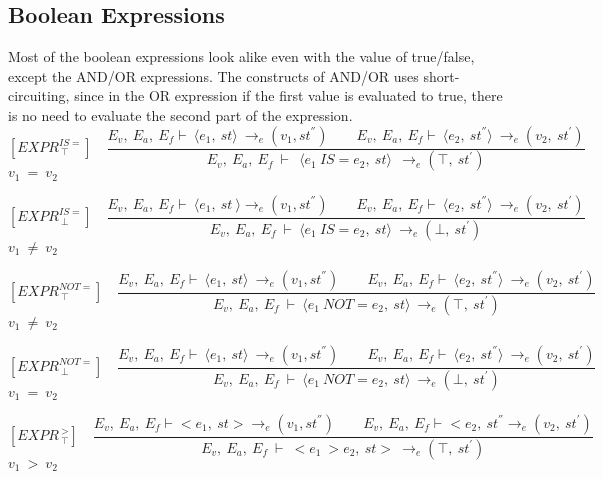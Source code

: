    	\subsection{Boolean Expressions}
   	Most of the boolean expressions look alike even with the value of true/false, except the AND/OR expressions. The constructs of AND/OR uses short-circuiting, since in the OR expression if the first value is evaluated to true, there is no need to evaluate the second part of the expression.
   	\[
   	[EXPR^{IS=}_{\ \top}] \quad
   	\dfrac{E_v, \ E_a, \ E_f \vdash \ \langle e_1, \ st \rangle \ \rightarrow_e (v_1, st^{''}) \qquad E_v, \ E_a, \ E_f \vdash \ \langle e_2, \ st^{''} \rangle \ \rightarrow_e (v_2, \ st^{'})}{E_v, \ E_a, \ E_f \ \vdash \ \ \langle e_1
   	\ IS= e_2, \ st \rangle \ \ \rightarrow_e (\top, \ st^{'})}
   	\]
   	\begin{math}
   	v_1 \ = \ v_2 
   	\end{math}

   	\[
   	[EXPR^{IS=}_{\ \bot}] \quad
   	\dfrac{E_v, \ E_a, \ E_f \vdash \ \langle e_1, \ st \ \rangle \rightarrow_e (v_1, st^{''}) \qquad E_v, \ E_a, \ E_f \vdash \ \langle e_2, \ st^{''} \rangle \ \rightarrow_e (v_2, \ st^{'})}{E_v, \ E_a, \ E_f \ \vdash \ \langle e_1
   	\ IS= e_2, \ st \rangle \ \rightarrow_e (\bot, \ st^{'})}
   	\]
	\begin{math}
   	v_1 \ \not= \ v_2
   	\end{math}


   	\[
   	[EXPR^{NOT=}_{\ \top}] \quad
   	\dfrac{E_v, \ E_a, \ E_f \vdash \ \langle e_1, \ st \rangle \ \rightarrow_e (v_1, st^{''}) \qquad E_v, \ E_a, \ E_f \vdash \ \langle e_2, \ st^{''} \rangle \ \rightarrow_e (v_2, \ st^{'})}{E_v, \ E_a, \ E_f \ \vdash \ \langle e_1 \ NOT= e_2, \ st \rangle \ \rightarrow_e (\top, \ st^{'})}
   	\]
	\begin{math}
   	v_1 \ \not= \ v_2
   	\end{math}   	
   	

   	\[
   	[EXPR^{NOT=}_{\ \bot}] \quad
   	\dfrac{E_v, \ E_a, \ E_f \vdash \ \langle e_1, \ st \rangle \ \rightarrow_e (v_1, st^{''}) \qquad E_v, \ E_a, \ E_f \vdash \ \langle e_2, \ st^{''} \rangle \ \rightarrow_e (v_2, \ st^{'})}{E_v, \ E_a, \ E_f \ \vdash \ \langle e_1 \ NOT= e_2, \ st \rangle \ \rightarrow_e (\bot, \ st^{'})}
   	\]
	\begin{math}
   	v_1 \ = \ v_2
   	\end{math}   	
   	
   	
   	\[
   	[EXPR^{\ >}_{\ \top}] \quad
   	\dfrac{E_v, \ E_a, \ E_f \vdash <e_1, \ st> \rightarrow_e (v_1, st^{''}) \qquad E_v, \ E_a, \ E_f \vdash <e_2, \ st^{''} \rightarrow_e (v_2, \ st^{'})}{E_v, \ E_a, \ E_f \ \vdash \ <e_1 \ > e_2, \ st> \ \rightarrow_e (\top, \ st^{'})}
   	\]
	\begin{math}
   	v_1 \ > \ v_2
   	\end{math}   	
   	
